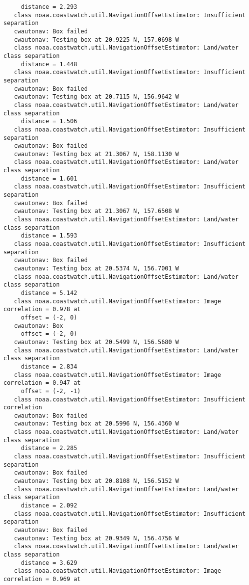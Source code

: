 \begin{verbatim}
     distance = 2.293
   class noaa.coastwatch.util.NavigationOffsetEstimator: Insufficient separation
   cwautonav: Box failed
   cwautonav: Testing box at 20.9225 N, 157.0698 W
   class noaa.coastwatch.util.NavigationOffsetEstimator: Land/water class separation 
     distance = 1.448
   class noaa.coastwatch.util.NavigationOffsetEstimator: Insufficient separation
   cwautonav: Box failed
   cwautonav: Testing box at 20.7115 N, 156.9642 W
   class noaa.coastwatch.util.NavigationOffsetEstimator: Land/water class separation 
     distance = 1.506
   class noaa.coastwatch.util.NavigationOffsetEstimator: Insufficient separation
   cwautonav: Box failed
   cwautonav: Testing box at 21.3067 N, 158.1130 W
   class noaa.coastwatch.util.NavigationOffsetEstimator: Land/water class separation 
     distance = 1.601
   class noaa.coastwatch.util.NavigationOffsetEstimator: Insufficient separation
   cwautonav: Box failed
   cwautonav: Testing box at 21.3067 N, 157.6508 W
   class noaa.coastwatch.util.NavigationOffsetEstimator: Land/water class separation 
     distance = 1.593
   class noaa.coastwatch.util.NavigationOffsetEstimator: Insufficient separation
   cwautonav: Box failed
   cwautonav: Testing box at 20.5374 N, 156.7001 W
   class noaa.coastwatch.util.NavigationOffsetEstimator: Land/water class separation 
     distance = 5.142
   class noaa.coastwatch.util.NavigationOffsetEstimator: Image correlation = 0.978 at 
     offset = (-2, 0)
   cwautonav: Box 
     offset = (-2, 0)
   cwautonav: Testing box at 20.5499 N, 156.5680 W
   class noaa.coastwatch.util.NavigationOffsetEstimator: Land/water class separation 
     distance = 2.834
   class noaa.coastwatch.util.NavigationOffsetEstimator: Image correlation = 0.947 at 
     offset = (-2, -1)
   class noaa.coastwatch.util.NavigationOffsetEstimator: Insufficient correlation
   cwautonav: Box failed
   cwautonav: Testing box at 20.5996 N, 156.4360 W
   class noaa.coastwatch.util.NavigationOffsetEstimator: Land/water class separation 
     distance = 2.285
   class noaa.coastwatch.util.NavigationOffsetEstimator: Insufficient separation
   cwautonav: Box failed
   cwautonav: Testing box at 20.8108 N, 156.5152 W
   class noaa.coastwatch.util.NavigationOffsetEstimator: Land/water class separation 
     distance = 2.092
   class noaa.coastwatch.util.NavigationOffsetEstimator: Insufficient separation
   cwautonav: Box failed
   cwautonav: Testing box at 20.9349 N, 156.4756 W
   class noaa.coastwatch.util.NavigationOffsetEstimator: Land/water class separation 
     distance = 3.629
   class noaa.coastwatch.util.NavigationOffsetEstimator: Image correlation = 0.969 at 

\end{verbatim}
